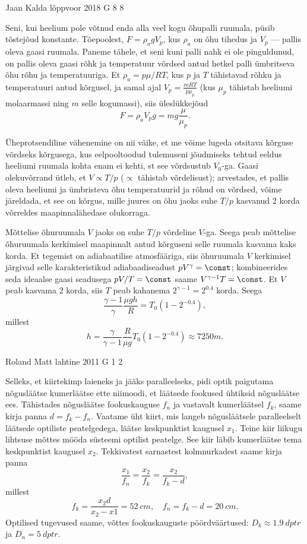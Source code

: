 \documentclass[11pt, twoside]{article}
\begin{document}
{%
{Jaan Kalda} %
{lõppvoor} %
{2018} %
{G 8} %
{8} %
{

\ifSolution
Seni, kui heelium pole võtnud enda alla veel kogu õhupalli ruumala, püsib tõstejõud konstante. Tõepoolest, $F=\rho_a g V_p$, kus $\rho_a$ on õhu tihedus ja $V_p$ --- pallis oleva gaasi ruumala. Paneme tähele, et seni kuni palli nahk ei ole pinguldunud, on pallis oleva gaasi rõhk ja temperatuur võrdsed antud hetkel palli ümbritseva õhu rõhu ja temperatuuriga. Et $\rho_a=p\mu/RT$, kus $p$ ja $T$ tähistavad rõhku ja temperatuuri antud kõrgusel, ja samal ajal $V_p=\frac {mRT}{p\mu_p}$ (kus $\mu_p$ tähistab heeliumi molaarmassi ning $m$ selle kogumassi), siis üleslükkejõud
\[
F=\rho_a V_p g=mg\frac{\mu}{\mu_p}.
\]

Üheprotsendiline vähenemine on nii väike, et me võime lugeda otsitava kõrguse võrdseks kõrgusega, kus eelpooltoodud tulemuseni jõudmiseks tehtud eeldus heeliumi ruumala kohta enam ei kehti, st see võrdsustub $V_0$-ga. Gaasi olekuvõrrand ütleb, et $V\propto T/p$ ($\propto$ tähistab võrdelisust); arvestades, et pallis oleva heeliumi ja ümbristeva õhu temperatuurid ja rõhud on võrdsed, võime järeldada, et see on kõrgus, mille juures on õhu jaoks suhe $T/p$ kasvanud 2 korda võrreldes maapinnalähedase olukorraga. 

Mõttelise õhuruumala $V$ jaoks on suhe $T/p$ võrdeline $V$-ga. Seega peab mõttelise õhuruumala kerkimisel maapinnalt antud kõrguseni selle ruumala kasvama kaks korda. Et tegemist on adiabaatilise atmosfääriga, siis õhuruumala $V$ kerkimisel järgivad selle karakteristikud adiabaadiseadust $pV^\gamma=\const$; kombineerides seda ideaalse gaasi seadusega $pV/T=\const$ saame $V^{\gamma-1}T=\const$. Et $V$ peab kasvama 2 korda, siis $T$ peab kahanema $2^{\gamma-1}=2^{0.4}$ korda. Seega
\[
\frac{\gamma-1}\gamma\frac{\mu g h}R =T_0(1-2^{-0.4}),
\]
millest
\[
h=\frac\gamma{\gamma-1}\frac R{\mu g}T_0(1-2^{-0.4})\approx\SI{7250}m.
\]
\fi
}

{Roland Matt} %
{lahtine} %
{2011} %
{G 1} %
{2} %
{

\ifSolution
Selleks, et kiirtekimp laieneks ja jääks paralleelseks, pidi optik paigutama
nõgusläätse kumerläätse ette niimoodi, et läätsede fookused ühtiksid nõgusläätse
ees. Tähistades nõgusläätse fookuskauguse $f_{n}$ ja vastavalt kumerläätsel
$f_{k}$, saame kirja panna $d=f_{k}-f_{n}$. Vaatame üht kiirt, mis langeb
nõgusläätsele paralleelselt läätsede optiliste peatelgedega, läätse keskpunktist
kaugusel $x_{1}$. Teine kiir liikugu lihtsuse mõttes mööda süsteemi optilist
peatelge. See kiir läbib kumerläätse tema keskpunktist kaugusel $x_{2}$.
Tekkivatest sarnastest kolmnurkadest saame kirja panna
\[ \frac{x_{1}}{f_{n}}=\frac{x_{2}}{f_{k}}=\frac{x_{2}}{f_{k}-d}, \] millest
\[ f_{k}=\frac{x_{2}d}{x_{2}-x{1}}=\SI{52}{cm},\quad f_{n}=f_{k}-d=\SI{20}{cm}.\]
Optilised tugevused saame, võttes fookuskauguste pöördväärtused:
$D_{k}\approx\SI{1,9}{dptr}$ ja $D_{n}=\SI{5}{dptr}$.
\fi
}

}
\end{document}
